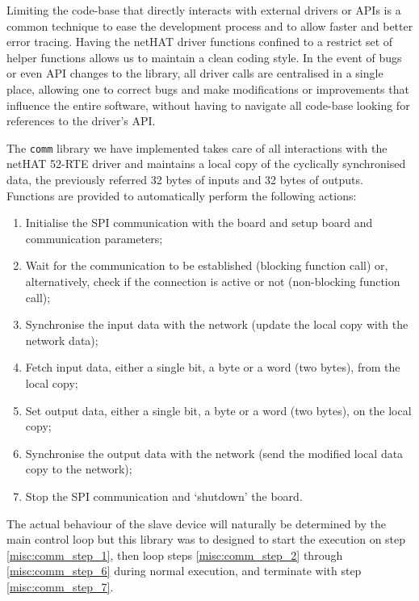 Limiting the code-base that directly interacts with external drivers or APIs is a common technique to ease the development process and to allow faster and better error tracing.
Having the netHAT driver functions confined to a restrict set of helper functions allows us to maintain a clean coding style.
In the event of bugs or even API changes to the library, all driver calls are centralised in a single place, allowing one to correct bugs and make modifications or improvements that influence the entire software, without having to navigate all code-base looking for references to the driver's API.

The \verb|comm| library we have implemented takes care of all interactions with the netHAT 52-RTE driver and maintains a local copy of the cyclically synchronised data, the previously referred 32 bytes of inputs and 32 bytes of outputs.
Functions are provided to automatically perform the following actions:

\begin{enumerate}
	\item Initialise the SPI communication with the board and setup board and communication parameters; \label{misc:comm_step_1}
	\item Wait for the communication to be established (blocking function call) or, alternatively, check if the connection is active or not (non-blocking function call); \label{misc:comm_step_2}
	\item Synchronise the input data with the network (update the local copy with the network data);
	\item Fetch input data, either a single bit, a byte or a word (two bytes), from the local copy;
	\item Set output data, either a single bit, a byte or a word (two bytes), on the local copy;
	\item Synchronise the output data with the network (send the modified local data copy to the network); \label{misc:comm_step_6}
	\item Stop the SPI communication and `shutdown' the board. \label{misc:comm_step_7}
\end{enumerate}

The actual behaviour of the slave device will naturally be determined by the main control loop but this library was to designed to start the execution on step \ref{misc:comm_step_1}, then loop steps \ref{misc:comm_step_2} through \ref{misc:comm_step_6} during normal execution, and terminate with step \ref{misc:comm_step_7}.


